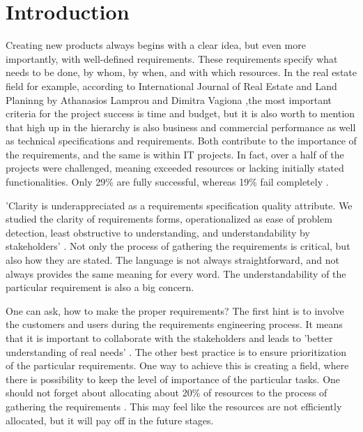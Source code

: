 \section{Introduction}
\par
Creating new products always begins with a clear idea, but even more importantly, with well-defined requirements. These requirements specify what needs to be done, by whom, by when, and with which resources. In the real estate field for example, according to International Journal of Real Estate and Land Planinng by Athanasios Lamprou and Dimitra Vagiona \cite{RealEstatePlanning},the most important criteria for the project success is time and budget, but it is also worth to mention that high up in the hierarchy is also business and commercial performance as well as technical
specifications and requirements. Both contribute to the importance of the requirements, and the same is within IT projects. In fact, over a half of the projects were challenged, meaning exceeded resources or lacking initially stated functionalities. Only 29\% are fully successful, whereas 19\% fail completely \cite{CriticalSuccessFactors}. 
\par
'Clarity is underappreciated as a requirements specification quality attribute. We studied the clarity of requirements forms, operationalized as ease of problem detection, least obstructive to understanding, and understandability by stakeholders' \cite{ClarityInRequirements}. Not only the process of gathering the requirements is critical, but also how they are stated. The language is not always straightforward, and not always provides the same meaning for every word. The understandability of the particular requirement is also a big concern. 
\par
One can ask, how to make the proper requirements? The first hint is to involve the customers and users during the requirements engineering process. It means that it is important to collaborate with the stakeholders and leads to 'better understanding of real needs' \cite{BestPractisesRE}. The other best practice is to ensure prioritization of the particular requirements. One way to achieve this is creating a field, where there is possibility to keep the level of importance of the particular tasks. One should not forget about allocating about 20\% of resources to the process of gathering the requirements \cite{BestPractisesRE}. This may feel like the resources are not efficiently allocated, but it will pay off in the future stages. 
\par
